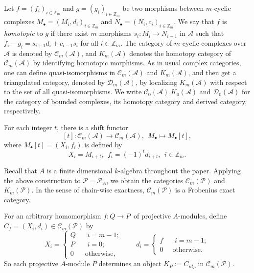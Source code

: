 \documentclass[reqno,12pt]{amsart}
\numberwithin{equation}{section}
\theoremstyle{plain}
\theoremstyle{definition}
\begin{document}
Let $f=(f_i)_{i\in\mathbb{Z}_m}$ and $g=(g_i)_{i\in\mathbb{Z}_m}$ be two morphisms between $m$-cyclic complexes ${{M}_{\bullet }}={{({{M}_{i}},{{d}_{i}})}_{i\in {{\mathbb{Z}}_{m}}}}$ and
${{N}_{\bullet }}={{({{N}_{i}},{{c}_{i}})}_{i\in {{\mathbb{Z}}_{m}}}}$.
We say that $f$ is \emph{homotopic} to $g$ if there exist $m$ morphisms $s_i:M_i\rightarrow N_{i-1}$ in $\mathcal{A}$ such that $f_i-g_i=s_{i+1}d_i+c_{i-1}s_i$ for all $i\in\mathbb{Z}_m$. The category of $m$-cyclic complexes over $\mathcal{A}$ is denoted by $\mathcal{C}_m(\mathcal{A})$, and $K_m(\mathcal{A})$ denotes the homotopy category of~$\mathcal{C}_m(\mathcal{A})$ by identifying homotopic morphisms. As in usual complex categories, one can define quasi-isomorphisms in $\mathcal{C}_m(\mathcal{A})$ and $K_m(\mathcal{A})$, and then get a triangulated category, denoted by $\mathcal{D}_m(\mathcal{A})$, by localizing $K_m(\mathcal{A})$ with respect to the set of all quasi-isomorphisms. We write $\mathcal{C}_0(\mathcal{A})$,$K_0(\mathcal{A})$ and $\mathcal{D}_0(\mathcal{A})$ for the category of bounded complexes, its homotopy category and derived category, respectively.

For each integer $t$, there is a shift functor $$[t]:\mathcal{C}_m(\mathcal{A})\rightarrow \mathcal{C}_m(\mathcal{A}),~~M_\bullet \mapsto M_\bullet[t],$$
where $M_\bullet[t]=(X_i,f_i)$ is defined by $$X_i=M_{i+t},~~f_i=(-1)^{t}d_{i+t},~~ i\in {\mathbb{Z}_m}.$$

Recall that $A$ is a finite dimensional $k$-algebra throughout the paper. Applying the above construction to $\mathscr{P}=\mathscr{P}_A$, we obtain the categories $\mathcal{C}_m(\mathscr{P})$ and $K_m(\mathscr{P})$. In the sense of chain-wise exactness, $\mathcal{C}_m(\mathscr{P})$ is a Frobenius exact category.

For an arbitrary homomorphism $f:Q{\rightarrow} P$~of projective $A$-modules, define $C_f=(X_i,d_i)\in \mathcal{C}_m({{\mathscr{P}}})$ by
$$X_i=\begin{cases} Q\;\;&\text{~$i=m-1$};\\
                    P\;\;&\text{~$i=0$};\\
                     0 &\text{otherwise,}\end{cases}\qquad
 d_i=\begin{cases} f\;\;&\text{~$i=m-1$};\\
                     0 &\text{otherwise.}\end{cases}$$
So each projective $A$-module $P$ determines an object ${{K}_{P}}:=C_{id_P}$ in $\mathcal{C}_m(\mathscr{P})$.
\end{document}
